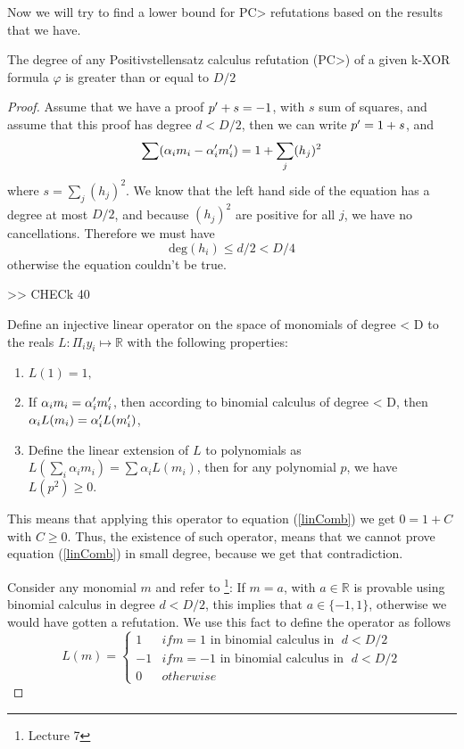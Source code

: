 \documentclass[a4paper,twoside,justified]{tufte-handout}
\begin{document}
Now we will try to find a lower bound for PC> refutations based on the results that we have.
\begin{theorem}
The degree of any Positivstellensatz calculus refutation (PC>) of a given k-XOR formula $\varphi$ is greater than or equal to $D/2$
\end{theorem}

\begin{proof}
Assume that we have a proof $p\rq{}+s=-1$, with $s$ sum of squares, and assume that this proof has degree $d<D/2$, then we can write $p\rq{} = 1+s$, and 
\begin{equation}
\sum (\alpha_i m_i - \alpha_i\rq{}m_i\rq{}) = 1 + \sum_j (h_j)^2
\end{equation}
where $s = \sum_j (h_j)^2$. We know that the left hand side of the equation has a degree at most $D/2$, and because $(h_j)^2$ are positive for all $j$, we have no cancellations. Therefore we must have
\begin{equation*}
\text{deg}(h_i) \leq d/2 < D/4
\end{equation*}
otherwise the equation couldn\rq{}t be true.


>> CHECk  40

Define an injective linear operator on the space of monomials of degree < D to the reals $L: \Pi_i y_i \mapsto \mathbb{R}$ with the following properties:
\begin{enumerate}
\item $L(1) = 1,$
\item If $\alpha_i m_i = \alpha_i\rq{}m_i\rq{}$, then according to binomial calculus of degree < D, then $\alpha_i L(m_i) = \alpha_i\rq{}L(m_i\rq{})$,
\item Define the linear extension of $L$ to polynomials as $L(\sum_i \alpha_i m_i) = \sum \alpha_i L(m_i)$, then for any polynomial $p$, we have $L(p^2) \geq 0$.
\end{enumerate}
This means that applying this operator to equation (\ref{linComb}) we get $ 0 = 1 + C$ with $C \geq 0$. Thus, the existence of such operator, means that we cannot prove equation (\ref{linComb}) in small degree, because we get that contradiction.

Consider any monomial $m$ and refer to \footnote{Lecture 7}: If $m=a$, with $a \in \mathbb{R}$  is provable using binomial calculus in degree $d< D/2$, this implies that $a \in \{-1,1\}$, otherwise we would have gotten a refutation. We use this fact to define the operator as follows
\begin{equation}
L(m) = \begin{cases}
      1 & if m=1 \text{ in binomial calculus in } \; d<D/2 \\
    -1 & if m=-1 \text{ in binomial calculus in } \; d<D/2 \\
      0 & otherwise
   \end{cases}
\end{equation}


\end{proof}
\end{document}
